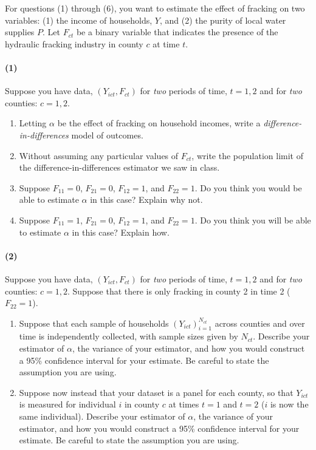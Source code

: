 \documentclass[12pt]{article}
\numberwithin{equation}{section}
\numberwithin{figure}{section}
\numberwithin{table}{section}
\begin{document}
For questions (1) through (6), you want to estimate the effect of fracking on two variables: (1) the income of households, $Y$, and (2) the purity of local water supplies $P$. Let $F_{ct}$ be a binary variable that indicates the presence of the hydraulic fracking industry in county $c$ at time $t$.

\paragraph{(1)} Suppose you have data, $(Y_{ict},F_{ct})$ for \emph{two} periods of time, $t=1,2$ and for \emph{two} counties: $c=1,2$.
\begin{enumerate}
\item Letting $\alpha$ be the effect of fracking on household incomes, write a \emph{difference-in-differences} model of outcomes.
\item Without assuming any particular values of $F_{ct}$, write the population limit of the difference-in-differences estimator we saw in class.
\item Suppose $F_{11}=0$, $F_{21}=0$, $F_{12}=1$, and $F_{22}=1$. Do you think you would be able to estimate $\alpha$ in this case? Explain why not.
\item Suppose $F_{11}=1$, $F_{21}=0$, $F_{12}=1$, and $F_{22}=1$. Do you think you will be able to estimate $\alpha$ in this case? Explain how.
\end{enumerate}

\paragraph{(2)} Suppose you have data, $(Y_{ict},F_{ct})$ for \emph{two} periods of time, $t=1,2$ and for \emph{two} counties: $c=1,2$. Suppose that there is only fracking in county 2 in time 2 ($F_{22}=1$).
\begin{enumerate}
\item Suppose that each sample of households $(Y_{ict})_{i=1}^{N_{ct}}$ across counties and over time is independently collected, with sample sizes given by $N_{ct}$. Describe your estimator of $\alpha$, the variance of your estimator, and how you would construct a 95\% confidence interval for your estimate. Be careful to state the assumption you are using.
\item Suppose now instead that your dataset is a panel for each county, so that $Y_{ict}$ is measured for individual $i$ in county $c$ at times $t=1$ and $t=2$ ($i$ is now the same individual). Describe your estimator of $\alpha$, the variance of your estimator, and how you would construct a 95\% confidence interval for your estimate. Be careful to state the assumption you are using.
\end{enumerate}
\end{document}
